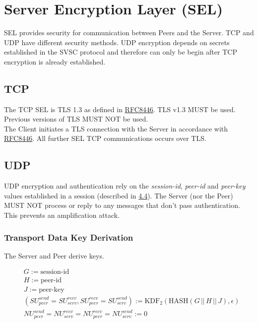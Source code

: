 \section{Server Encryption Layer (SEL)}

SEL provides security for communication between Peers and the Server. TCP and UDP have
different security methods. UDP encryption depends on secrets established in the SVSC protocol and therefore can only
be begin after TCP encryption is already established.

\subsection{TCP}

The TCP SEL is TLS 1.3 as defined in
\href{https://datatracker.ietf.org/doc/html/rfc8446}{RFC8446}. TLS v1.3 MUST be used. Previous versions of TLS MUST NOT be used.\\

The Client initiates a TLS connection with the Server in accordance with \href{https://datatracker.ietf.org/doc/html/rfc8446}{RFC8446}. All further SEL TCP communications occurs over TLS.

\subsection{UDP}

UDP encryption and authentication rely on the \emph{session-id}, \emph{peer-id} and \emph{peer-key} values
established in a session
(described in \hyperlink{subsection.4.4}{4.4}). The Server (nor the Peer) MUST NOT
process or reply to any messages that don't pass authentication. This prevents an amplification attack.\\

\subsubsection{Transport Data Key Derivation}

The Server and Peer derive keys.

\begin{align*}
    &  G:= \text{session-id}                                                               \\
    &  H := \text{peer-id}                                                                \\
    &  J := \text{peer-key}                                                              \\
    &  (\mathit{SU}_{peer}^{send} = \mathit{SU}_{serv}^{recv}, \mathit{SU}_{peer}^{recv} = \mathit{SU}_{serv}^{send}) := \text{KDF}_2(\text{HASH}(G\,
    ||\, H\,||\, J), \epsilon)                                        \\
    &   \mathit{NU}_{peer}^{send} = \mathit{NU}_{serv}^{recv} = \mathit{NU}_{peer}^{recv} = \mathit{NU}_{serv}^{send} := 0
\end{align*}

